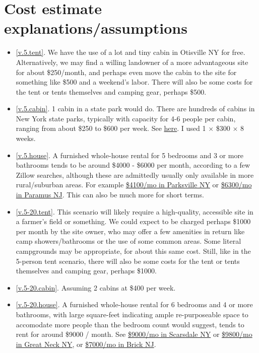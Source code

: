 \documentclass[10pt]{article}
\begin{document}
\section*{Cost estimate explanations/assumptions}
\begin{itemize}[leftmargin=*]
\itemsep0em
  \item[]{\ref{v.5.tent}. We have the use of a lot and tiny cabin in Otisville NY for free. Alternatively, we may find a willing landowner of a more advantageous site for about \$250/month, and perhaps even move the cabin to the site for something like \$500 and a weekend's labor. There will also be some costs for the tent or tents themselves and camping gear, perhaps \$500.}
  \item[]{\ref{v.5.cabin}. 1 cabin in a state park would do. There are hundreds of cabins in New York state parks, typically with capacity for 4-6 people per cabin, ranging from about \$250 to \$600 per week. See \href{https://newyorkstateparks.reserveamerica.com/}{here}. I used 1 $\times$ \$300 $\times$ 8 weeks.}
  \item[]{\ref{v.5.house}. A furnished whole-house rental for 5 bedrooms and 3 or more bathrooms tends to be around \$4000 - \$6000 per month, according to a few Zillow searches, although these are admittedly usually only available in more rural/suburban areas. For example \href{https://www.zillow.com/homedetails/57-Snow-Hill-Rd-Parksville-NY-12768/32773677_zpid/}{\$4100/mo in Parksville NY} or \href{https://www.zillow.com/homedetails/284-Taft-Ct-Paramus-NJ-07652/37992854_zpid/}{\$6300/mo in Paramus NJ}. This can also be much more for short terms.}
  \item[]{\ref{v.5-20.tent}. This scenario will likely require a high-quality, accessible site in a farmer's field or something. We could expect to be charged perhaps \$1000 per month by the site owner, who may offer a few amenities in return like camp showers/bathrooms or the use of some common areas. Some literal campgrounds may be appropriate, for about this same cost. Still, like in the 5-person tent scenario, there will also be some costs for the tent or tents themselves and camping gear, perhaps \$1000.}
  \item[]{\ref{v.5-20.cabin}. Assuming 2 cabins at \$400 per week.}
  \item[]{\ref{v.5-20.house}. A furnished whole-house rental for 6 bedrooms and 4 or more bathrooms, with large square-feet indicating ample re-purposeable space to accomodate more people than the bedroom count would suggest, tends to rent for around \$9000 / month. See \href{https://www.zillow.com/homedetails/3-Forest-Ln-Scarsdale-NY-10583/33095321_zpid/}{\$9000/mo in Scarsdale NY} or \href{https://www.zillow.com/homedetails/75-Meadow-Woods-Rd-Great-Neck-NY-11020/31069513_zpid/}{\$9800/mo in Great Neck NY}, or \href{https://www.zillow.com/homedetails/14-Toledo-Dr-Brick-NJ-08723/39546690_zpid/}{\$7000/mo in Brick NJ}.}

\end{itemize}
\end{document}
